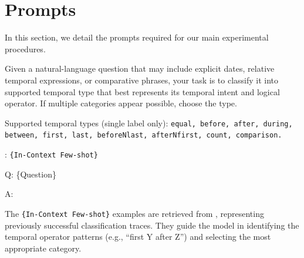 \clearpage
\newpage
\onecolumn



\section{Prompts}\label{appendix:prompt}
In this section, we detail the prompts required for our main experimental procedures.

\begin{center}
\begin{minipage}{0.9\columnwidth}
    \vspace{2mm}
    \centering
    \begin{tcolorbox}[title=Temporal Type Classification Prompt Template]
        \small
Given a natural-language question that may include explicit dates, relative temporal expressions, or comparative phrases, your task is to classify it into  supported temporal type that best represents its temporal intent and logical operator.  
If multiple categories appear possible, choose the  type.

Supported temporal types (single label only):  
\texttt{equal, before, after, during, between, first, last, beforeNlast, afterNfirst, count, comparison.}


\vspace{5pt}
:
\texttt{\{In-Context Few-shot\}}
\vspace{5pt}

Q: \{Question\}

A:
    \end{tcolorbox}
    \vspace{2mm}
\end{minipage}
\end{center}
\noindent
The \texttt{\{In-Context Few-shot\}} examples are retrieved from , representing previously successful classification traces.  
They guide the model in identifying the temporal operator patterns (e.g., “first Y after Z”) and selecting the most appropriate category.

\vspace{6mm}

